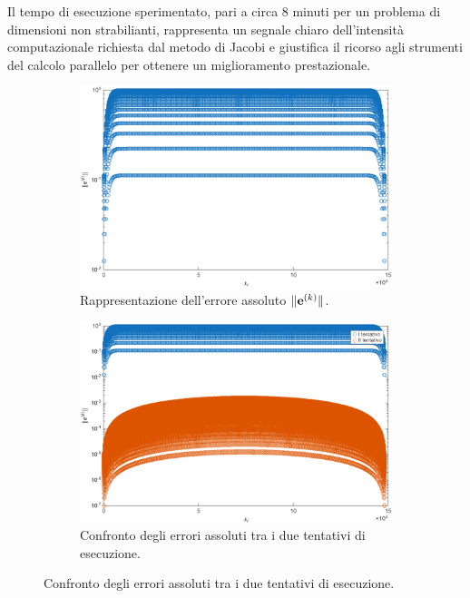     Il tempo di esecuzione sperimentato, pari a circa $\num{8}$ minuti per un problema di dimensioni non strabilianti, rappresenta un segnale chiaro
    dell'intensit\`a computazionale richiesta dal metodo di Jacobi e giustifica il ricorso agli strumenti del calcolo parallelo per ottenere un miglioramento prestazionale.
    \begin{figure}[!htbp]
        \centering
        \begin{subfigure}{0.58\textwidth}
            \centering
            \includegraphics[width=\linewidth]{../Risorse/Capitolo 3/erroreAssolutoJacobi1.png}
            \caption{Rappresentazione dell'errore assoluto $\lVert\mathbf{e}^{(k)}\rVert$.}
            \label{fig:erroreAssolutoJacobi1}
        \end{subfigure}

        \vspace{1.5em}

        \begin{subfigure}{0.58\textwidth}
            \centering
            \includegraphics[width=\linewidth]{../Risorse/Capitolo 3/confrontoErroriAssoluti.png}
            \caption{Confronto degli errori assoluti tra i due tentativi di esecuzione.}
            \label{fig:confrontoErroriAssoluti}
        \end{subfigure}


\end{figure}
